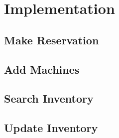 \chapter{Implementation}
\label{chap:figtab}
\section{Make Reservation}
\section{Add Machines}
\section{Search Inventory}
\section{Update Inventory}

